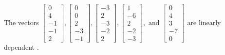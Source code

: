 \begin{exercise}
\begin{exerciseStatement}
  \end{exerciseStatement}
  \begin{exerciseAnswer}
   The vectors \(\left[\begin{array}{r}
0 \\
4 \\
-1 \\
-1 \\
2
\end{array}\right] , \left[\begin{array}{r}
0 \\
0 \\
2 \\
-3 \\
-1
\end{array}\right] , \left[\begin{array}{r}
-3 \\
2 \\
-3 \\
-2 \\
2
\end{array}\right] , \left[\begin{array}{r}
1 \\
-6 \\
2 \\
-2 \\
-3
\end{array}\right] , \text{ and } \left[\begin{array}{r}
0 \\
4 \\
3 \\
-7 \\
0
\end{array}\right]\) are 
  	 linearly dependent  .
  


  \end{exerciseAnswer}
\end{exercise}